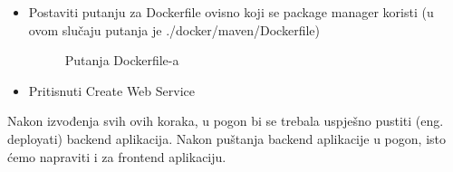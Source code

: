 \begin{itemize}
                    \item Postaviti putanju za Dockerfile ovisno koji se package manager koristi (u ovom slučaju putanja je ./docker/maven/Dockerfile)
                    \begin{figure}[H]
    			\centering
    			\caption{Putanja Dockerfile-a}
    			\label{fig:dockerFilePath}
    			\end{figure}
                    \item Pritisnuti Create Web Service
                \end{itemize}

                Nakon izvođenja svih ovih koraka, u pogon bi se trebala uspješno pustiti (eng. deployati) backend aplikacija. Nakon puštanja backend aplikacije u pogon, isto ćemo napraviti i za frontend aplikaciju.